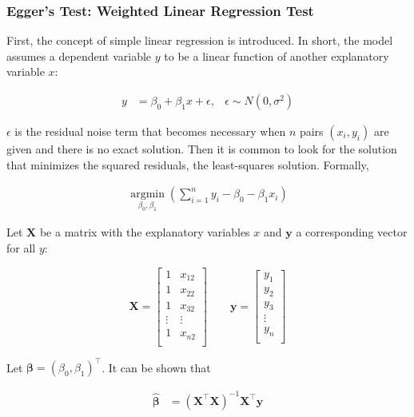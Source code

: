 \subsubsection{Egger's Test: Weighted Linear Regression Test} \label{sec:Egger}
First, the concept of simple linear regression is introduced. In short, the model assumes a dependent variable $y$ to be a linear function of another explanatory variable $x$:

\begin{align}
y &= \beta_0 + \beta_1 x + \epsilon, & \epsilon \sim N(0, \sigma^2) \label{eq:simple.regression}
\end{align}

$\epsilon$ is the residual noise term that becomes necessary when $n$ pairs $(x_i, y_i)$ are given and there is no exact solution. Then it is common to look for the solution that minimizes the squared residuals, the least-squares solution. Formally,

\begin{align}
\operatorname*{argmin}_{\beta_0, \beta_1}(\sum_{i = 1}^n y_i - \beta_0 - \beta_1 x_i) \label{eq:least.squares}
\end{align}

Let $\mathbf{X}$ be a matrix with the explanatory variables $x$ and $\mathbf{y}$ a corresponding vector for all $y$:

\begin{equation*}
\mathbf{X} = 
\begin{bmatrix}
1 & x_{12} \\
1 & x_{22} \\
1 & x_{32} \\
\vdots & \vdots \\
1 & x_{n2} \\
\end{bmatrix} 
\qquad
\mathbf{y} = 
\begin{bmatrix}
y_1 \\
y_2 \\
y_3 \\
\vdots \\
y_n \\
\end{bmatrix}
\end{equation*}

Let $\mathbf{\beta} = (\beta_0, \beta_1)^\top$. It can be shown that 

\begin{align}
\hat{\mathbf{\beta}} &= (\mathbf{X}^\top \mathbf{X})^{-1} \mathbf{X}^\top \mathbf{y} \label{eq:regression.parameters}
\end{align}

